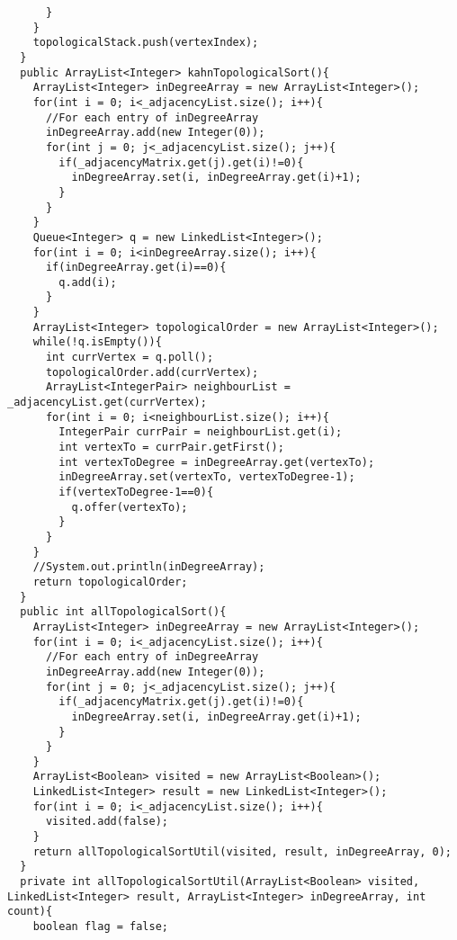 \documentclass[11pt]{article}
\theoremstyle{definition}
\begin{document}
\begin{verbatim}
      }
    }
    topologicalStack.push(vertexIndex);
  }
  public ArrayList<Integer> kahnTopologicalSort(){
    ArrayList<Integer> inDegreeArray = new ArrayList<Integer>();
    for(int i = 0; i<_adjacencyList.size(); i++){
      //For each entry of inDegreeArray
      inDegreeArray.add(new Integer(0));
      for(int j = 0; j<_adjacencyList.size(); j++){
        if(_adjacencyMatrix.get(j).get(i)!=0){
          inDegreeArray.set(i, inDegreeArray.get(i)+1);
        }
      }
    }
    Queue<Integer> q = new LinkedList<Integer>();
    for(int i = 0; i<inDegreeArray.size(); i++){
      if(inDegreeArray.get(i)==0){
        q.add(i);
      }
    }
    ArrayList<Integer> topologicalOrder = new ArrayList<Integer>();
    while(!q.isEmpty()){
      int currVertex = q.poll();
      topologicalOrder.add(currVertex);
      ArrayList<IntegerPair> neighbourList = _adjacencyList.get(currVertex);
      for(int i = 0; i<neighbourList.size(); i++){
        IntegerPair currPair = neighbourList.get(i);
        int vertexTo = currPair.getFirst();
        int vertexToDegree = inDegreeArray.get(vertexTo);
        inDegreeArray.set(vertexTo, vertexToDegree-1);
        if(vertexToDegree-1==0){
          q.offer(vertexTo);
        }
      }
    }
    //System.out.println(inDegreeArray);
    return topologicalOrder;
  }
  public int allTopologicalSort(){
    ArrayList<Integer> inDegreeArray = new ArrayList<Integer>();
    for(int i = 0; i<_adjacencyList.size(); i++){
      //For each entry of inDegreeArray
      inDegreeArray.add(new Integer(0));
      for(int j = 0; j<_adjacencyList.size(); j++){
        if(_adjacencyMatrix.get(j).get(i)!=0){
          inDegreeArray.set(i, inDegreeArray.get(i)+1);
        }
      }
    }
    ArrayList<Boolean> visited = new ArrayList<Boolean>();
    LinkedList<Integer> result = new LinkedList<Integer>();
    for(int i = 0; i<_adjacencyList.size(); i++){
      visited.add(false);
    }
    return allTopologicalSortUtil(visited, result, inDegreeArray, 0);
  }
  private int allTopologicalSortUtil(ArrayList<Boolean> visited, LinkedList<Integer> result, ArrayList<Integer> inDegreeArray, int count){
    boolean flag = false;
    

\end{verbatim}
\end{document}
